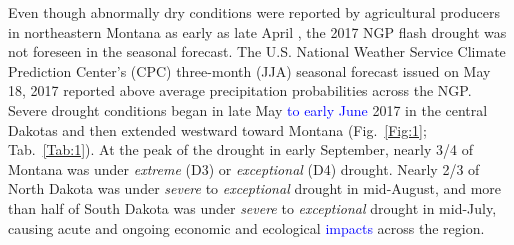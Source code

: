 \documentclass[hess, manuscript]{copernicus}
\def\TG{\textcolor{blue}}
\begin{document}
Even though abnormally dry conditions were reported by agricultural producers in northeastern Montana as early as late April \citep{MontanaDNRC_2017}, the 2017 NGP flash drought was not foreseen in the seasonal forecast. The U.S. National Weather Service Climate Prediction Center’s (CPC) three-month (JJA) seasonal forecast issued on May 18, 2017 reported above average precipitation probabilities across the NGP. Severe drought conditions \citep[D2 as classified by the U.S. Drought Monitor, USDM,][]{Svoboda_2002} began in late May \TG{to early June} 2017 in the central Dakotas and then extended westward toward Montana (Fig.~\ref{Fig:1}; Tab.~\ref{Tab:1}). At the peak of the drought in early September, nearly 3/4 of Montana was under \emph{extreme} (D3) or \emph{exceptional} (D4) drought. Nearly 2/3 of North Dakota was under \emph{severe} to \emph{exceptional} drought in mid-August, and more than half of South Dakota was under \emph{severe} to \emph{exceptional} drought in mid-July, causing acute and ongoing economic and ecological \TG{impacts} across the region. 
\end{document}
